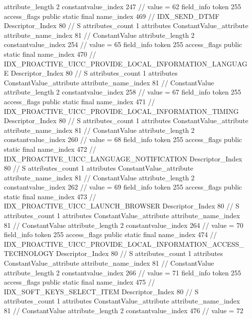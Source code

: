 {{{{{{{					attribute_length	2
					constantvalue_index	247		// value = 62
				}
				}
			}
			field_info {
				token	255
				access_flags	public static final
				name_index	469		// IDX_SEND_DTMF
				Descriptor_Index	80		// S
				attributes_count	1
				attributes {
				ConstantValue_attribute {
					attribute_name_index	81		// ConstantValue
					attribute_length	2
					constantvalue_index	254		// value = 65
				}
				}
			}
			field_info {
				token	255
				access_flags	public static final
				name_index	470		// IDX_PROACTIVE_UICC_PROVIDE_LOCAL_INFORMATION_LANGUAGE
				Descriptor_Index	80		// S
				attributes_count	1
				attributes {
				ConstantValue_attribute {
					attribute_name_index	81		// ConstantValue
					attribute_length	2
					constantvalue_index	258		// value = 67
				}
				}
			}
			field_info {
				token	255
				access_flags	public static final
				name_index	471		// IDX_PROACTIVE_UICC_PROVIDE_LOCAL_INFORMATION_TIMING
				Descriptor_Index	80		// S
				attributes_count	1
				attributes {
				ConstantValue_attribute {
					attribute_name_index	81		// ConstantValue
					attribute_length	2
					constantvalue_index	260		// value = 68
				}
				}
			}
			field_info {
				token	255
				access_flags	public static final
				name_index	472		// IDX_PROACTIVE_UICC_LANGUAGE_NOTIFICATION
				Descriptor_Index	80		// S
				attributes_count	1
				attributes {
				ConstantValue_attribute {
					attribute_name_index	81		// ConstantValue
					attribute_length	2
					constantvalue_index	262		// value = 69
				}
				}
			}
			field_info {
				token	255
				access_flags	public static final
				name_index	473		// IDX_PROACTIVE_UICC_LAUNCH_BROWSER
				Descriptor_Index	80		// S
				attributes_count	1
				attributes {
				ConstantValue_attribute {
					attribute_name_index	81		// ConstantValue
					attribute_length	2
					constantvalue_index	264		// value = 70
				}
				}
			}
			field_info {
				token	255
				access_flags	public static final
				name_index	474		// IDX_PROACTIVE_UICC_PROVIDE_LOCAL_INFORMATION_ACCESS_TECHNOLOGY
				Descriptor_Index	80		// S
				attributes_count	1
				attributes {
				ConstantValue_attribute {
					attribute_name_index	81		// ConstantValue
					attribute_length	2
					constantvalue_index	266		// value = 71
				}
				}
			}
			field_info {
				token	255
				access_flags	public static final
				name_index	475		// IDX_SOFT_KEYS_SELECT_ITEM
				Descriptor_Index	80		// S
				attributes_count	1
				attributes {
				ConstantValue_attribute {
					attribute_name_index	81		// ConstantValue
					attribute_length	2
					constantvalue_index	476		// value = 72
}}}}}}}
